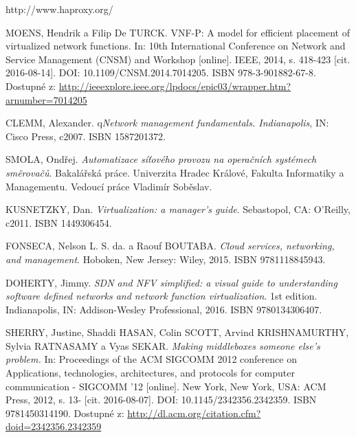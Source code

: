 \begin{thebibliography}{10}

 http://www.haproxy.org/


MOENS, Hendrik a Filip De TURCK. VNF-P: A model for efficient placement of virtualized network functions. In: 10th International Conference on Network and Service Management (CNSM) and Workshop [online]. IEEE, 2014, s. 418-423 [cit. 2016-08-14]. DOI: 10.1109/CNSM.2014.7014205. ISBN 978-3-901882-67-8. Dostupné z: \url{http://ieeexplore.ieee.org/lpdocs/epic03/wrapper.htm?arnumber=7014205}

 CLEMM, Alexander. q\emph{Network management fundamentals. Indianapolis}, IN: Cisco Press, c2007. ISBN 1587201372.

 SMOLA, Ondřej. \emph{Automatizace síťového provozu na operačních systémech směrovačů}. Bakalářská práce. Univerzita Hradec Králové, Fakulta Informatiky a Managementu. Vedoucí práce Vladimír Soběslav. 




KUSNETZKY, Dan. \emph{Virtualization: a manager's guide}. Sebastopol, CA: O'Reilly, c2011. ISBN 1449306454.

FONSECA, Nelson L. S. da. a Raouf BOUTABA. \emph{Cloud services, networking, and management}. Hoboken, New Jersey: Wiley, 2015. ISBN 9781118845943.

 DOHERTY, Jimmy. \emph{SDN and NFV simplified: a visual guide to understanding software defined networks and network function virtualization}. 1st edition. Indianapolis, IN: Addison-Wesley Professional, 2016. ISBN 9780134306407.




SHERRY, Justine, Shaddi HASAN, Colin SCOTT, Arvind KRISHNAMURTHY, Sylvia RATNASAMY a Vyas SEKAR. \emph{Making middleboxes someone else's problem.} In: Proceedings of the ACM SIGCOMM 2012 conference on Applications, technologies, architectures, and protocols for computer communication - SIGCOMM '12 [online]. New York, New York, USA: ACM Press, 2012, s. 13- [cit. 2016-08-07]. DOI: 10.1145/2342356.2342359. ISBN 9781450314190. Dostupné z: \url{http://dl.acm.org/citation.cfm?doid=2342356.2342359}


\end{thebibliography}
